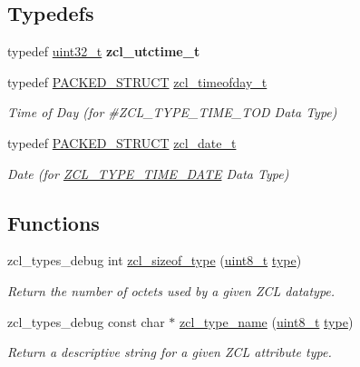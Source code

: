 \subsection*{Typedefs}
\begin{DoxyCompactItemize}
\item 
\mbox{\label{group__zcl__types_gadd8ad64f3ae1ee581114f9ca39f3621f}} 
typedef \hyperlink{group__hal__dos_ga09a1e304d66d35dd47daffee9731edaa}{uint32\+\_\+t} {\bfseries zcl\+\_\+utctime\+\_\+t}
\item 
typedef \hyperlink{group___s_x_a_ga4233297bd31be5c273d4fb0758cc54d7}{P\+A\+C\+K\+E\+D\+\_\+\+S\+T\+R\+U\+CT} \hyperlink{group__zcl__types_gafa65aea1347d7c84cd0019a7e013b8f5}{zcl\+\_\+timeofday\+\_\+t}
\begin{DoxyCompactList}\small\item\em Time of Day (for \#\+Z\+C\+L\+\_\+\+T\+Y\+P\+E\+\_\+\+T\+I\+M\+E\+\_\+\+T\+OD Data Type) \end{DoxyCompactList}\item 
typedef \hyperlink{group___s_x_a_ga4233297bd31be5c273d4fb0758cc54d7}{P\+A\+C\+K\+E\+D\+\_\+\+S\+T\+R\+U\+CT} \hyperlink{group__zcl__types_ga9ea8f9ebe25e922be76329748b8398b5}{zcl\+\_\+date\+\_\+t}
\begin{DoxyCompactList}\small\item\em Date (for \hyperlink{group__zcl__types_gad5552b0825d941f0ccd7b1d797dc091b}{Z\+C\+L\+\_\+\+T\+Y\+P\+E\+\_\+\+T\+I\+M\+E\+\_\+\+D\+A\+TE} Data Type) \end{DoxyCompactList}\end{DoxyCompactItemize}
\subsection*{Functions}
\begin{DoxyCompactItemize}
\item 
zcl\+\_\+types\+\_\+debug int \hyperlink{group__zcl__types_ga6134ab27d38abd300d008345e21fe560}{zcl\+\_\+sizeof\+\_\+type} (\hyperlink{group__hal__dos_gae1affc9ca37cfb624959c866a73f83c2}{uint8\+\_\+t} \hyperlink{group__zcl_ga1d127017fb298b889f4ba24752d08b8e}{type})
\begin{DoxyCompactList}\small\item\em Return the number of octets used by a given Z\+CL datatype. \end{DoxyCompactList}\item 
zcl\+\_\+types\+\_\+debug const char $\ast$ \hyperlink{group__zcl__types_ga798e87a8b8f240a33706b7bc37c9ede1}{zcl\+\_\+type\+\_\+name} (\hyperlink{group__hal__dos_gae1affc9ca37cfb624959c866a73f83c2}{uint8\+\_\+t} \hyperlink{group__zcl_ga1d127017fb298b889f4ba24752d08b8e}{type})
\begin{DoxyCompactList}\small\item\em Return a descriptive string for a given Z\+CL attribute type. \end{DoxyCompactList}\end{DoxyCompactItemize}

